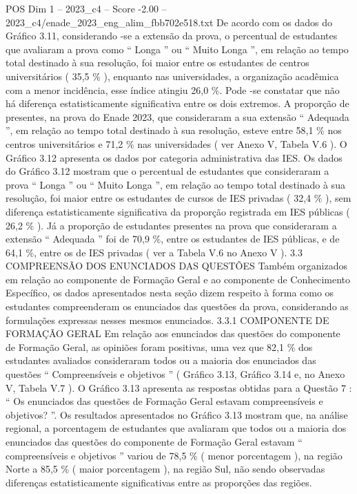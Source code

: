 \begin{textsample}{POS Dim 1 – 2023\_c4 – Score -2.00 – 2023\_c4/enade\_2023\_eng\_alim\_fbb702e518.txt}
De acordo com os dados do Gráfico 3.11, considerando -se a extensão da prova, o percentual de estudantes que avaliaram a prova como “ Longa ” ou “ Muito Longa ”, em relação ao tempo total destinado à sua resolução, foi maior entre os estudantes de centros universitários ( 35,5 \% ), enquanto nas universidades, a organização acadêmica com a menor incidência, esse índice atingiu 26,0 \%.
Pode -se constatar que não há diferença estatisticamente significativa entre os dois extremos.
A proporção de presentes, na prova do Enade 2023, que consideraram a sua extensão “ Adequada ”, em relação ao tempo total destinado à sua resolução, esteve entre 58,1 \% nos centros universitários e 71,2 \% nas universidades ( ver Anexo V, Tabela V.6 ).
O Gráfico 3.12 apresenta os dados por categoria administrativa das IES.
Os dados do Gráfico 3.12 mostram que o percentual de estudantes que consideraram a prova “ Longa ” ou “ Muito Longa ”, em relação ao tempo total destinado à sua resolução, foi maior entre os estudantes de cursos de IES privadas ( 32,4 \% ), sem diferença estatisticamente significativa da proporção registrada em IES públicas ( 26,2 \% ).
Já a proporção de estudantes presentes na prova que consideraram a extensão “ Adequada ” foi de 70,9 \%, entre os estudantes de IES públicas, e de 64,1 \%, entre os de IES privadas ( ver a Tabela V.6 no Anexo V ). 3.3 COMPREENSÃO DOS ENUNCIADOS DAS QUESTÕES Também organizados em relação ao componente de Formação Geral e ao componente de Conhecimento Específico, os dados apresentados nesta seção dizem respeito à forma como os estudantes compreenderam os enunciados das questões da prova, considerando as formulações expressas nesses mesmos enunciados. 3.3.1 COMPONENTE DE FORMAÇÃO GERAL Em relação aos enunciados das questões do componente de Formação Geral, as opiniões foram positivas, uma vez que 82,1 \% dos estudantes avaliados consideraram todos ou a maioria dos enunciados das questões “ Compreensíveis e objetivos ” ( Gráfico 3.13, Gráfico 3.14 e, no Anexo V, Tabela V.7 ).
O Gráfico 3.13 apresenta as respostas obtidas para a Questão 7 : “ Os enunciados das questões de Formação Geral estavam compreensíveis e objetivos? ”.
Os resultados apresentados no Gráfico 3.13 mostram que, na análise regional, a porcentagem de estudantes que avaliaram que todos ou a maioria dos enunciados das questões do componente de Formação Geral estavam “ compreensíveis e objetivos ” variou de 78,5 \% ( menor porcentagem ), na região Norte a 85,5 \% ( maior porcentagem ), na região Sul, não sendo observadas diferenças estatisticamente significativas entre as proporções das regiões.

\end{textsample}
